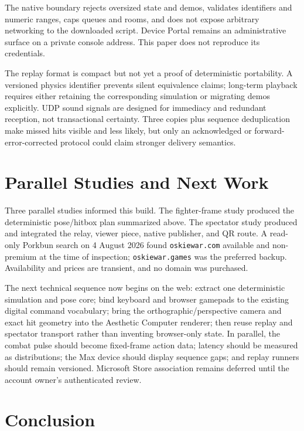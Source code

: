 \documentclass[10pt,letterpaper,twocolumn]{article}
\newcommand{\code}[1]{\texttt{#1}}
\begin{document}
The native boundary rejects oversized state and demos, validates identifiers and numeric ranges, caps queues and rooms, and does not expose arbitrary networking to the downloaded script. Device Portal remains an administrative surface on a private console address. This paper does not reproduce its credentials.

The replay format is compact but not yet a proof of deterministic portability. A versioned physics identifier prevents silent equivalence claims; long-term playback requires either retaining the corresponding simulation or migrating demos explicitly. UDP sound signals are designed for immediacy and redundant reception, not transactional certainty. Three copies plus sequence deduplication make missed hits visible and less likely, but only an acknowledged or forward-error-corrected protocol could claim stronger delivery semantics.

\section{Parallel Studies and Next Work}

Three parallel studies informed this build. The fighter-frame study produced the deterministic pose/hitbox plan summarized above. The spectator study produced and integrated the relay, viewer piece, native publisher, and QR route. A read-only Porkbun search on 4 August 2026 found \code{oskiewar.com} available and non-premium at the time of inspection; \code{oskiewar.games} was the preferred backup. Availability and prices are transient, and no domain was purchased.

The next technical sequence now begins on the web: extract one deterministic simulation and pose core; bind keyboard and browser gamepads to the existing digital command vocabulary; bring the orthographic/perspective camera and exact hit geometry into the Aesthetic Computer renderer; then reuse replay and spectator transport rather than inventing browser-only state. In parallel, the combat pulse should become fixed-frame action data; latency should be measured as distributions; the Max device should display sequence gaps; and replay runners should remain versioned. Microsoft Store association remains deferred until the account owner's authenticated review.

\section{Conclusion}
\end{document}
